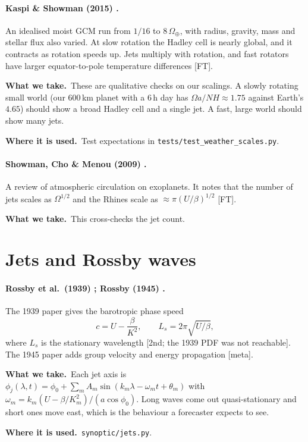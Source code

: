 \documentclass[11pt,a4paper]{article}
\newcommand{\verif}[1]{\textsf{\small[#1]}}
\newcommand{\takes}{\par\noindent\textbf{What we take.}\ }
\newcommand{\used}{\par\noindent\textbf{Where it is used.}\ }
\begin{document}
\paragraph{Kaspi \& Showman (2015) \cite{kaspi2015}.}
An idealised moist GCM run from $1/16$ to $8\,\Omega_\oplus$, with radius, gravity, mass
and stellar flux also varied. At slow rotation the Hadley cell is nearly global, and it
contracts as rotation speeds up. Jets multiply with rotation, and fast rotators have larger
equator-to-pole temperature differences \verif{FT}.
\takes These are qualitative checks on our scalings. A slowly rotating small world (our
600\,km planet with a 6\,h day has $\Omega a/NH \approx 1.75$ against Earth's $4.65$)
should show a broad Hadley cell and a single jet. A fast, large world should show many jets.
\used Test expectations in \texttt{tests/test\_weather\_scales.py}.

\paragraph{Showman, Cho \& Menou (2009) \cite{showman2009}.}
A review of atmospheric circulation on exoplanets. It notes that the number of jets scales
as $\Omega^{1/2}$ and the Rhines scale as $\approx \pi (U/\beta)^{1/2}$ \verif{FT}.
\takes This cross-checks the jet count.

\section{Jets and Rossby waves}

\paragraph{Rossby et al.\ (1939) \cite{rossby1939}; Rossby (1945) \cite{rossby1945}.}
The 1939 paper gives the barotropic phase speed
\begin{equation}
  c = U - \frac{\beta}{K^2}, \qquad L_s = 2\pi\sqrt{U/\beta},
\end{equation}
where $L_s$ is the stationary wavelength \verif{2nd; the 1939 PDF was not reachable}. The
1945 paper adds group velocity and energy propagation \verif{meta}.
\takes Each jet axis is
$\phi_j(\lambda,t)=\phi_0+\sum_m A_m\sin(k_m\lambda-\omega_m t+\theta_m)$ with
$\omega_m = k_m(U - \beta/K_m^2)/(a\cos\phi_0)$. Long waves come out quasi-stationary and
short ones move east, which is the behaviour a forecaster expects to see.
\used \texttt{synoptic/jets.py}.
\end{document}

